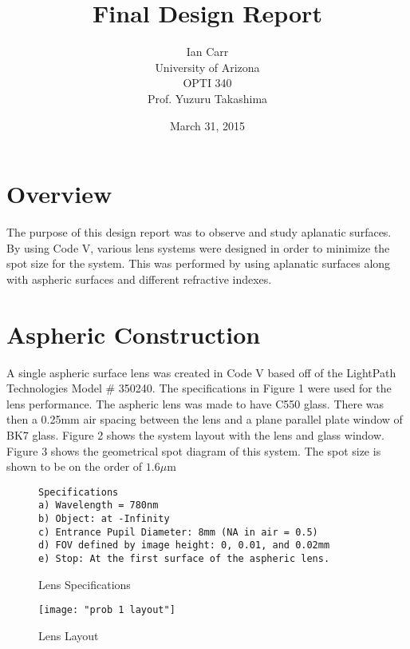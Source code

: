 \documentclass{article}
\begin{document}
\title{Final Design Report}
\author{Ian Carr\\
University of Arizona\\
OPTI 340\\
Prof. Yuzuru Takashima}
\date{March 31, 2015}

\maketitle

\newpage

\tableofcontents
\listoffigures


\section*{Overview}
The purpose of this design report was to observe and study aplanatic surfaces. By using Code V, various lens systems were designed in order to minimize the spot size for the system. This was performed by using aplanatic surfaces along with aspheric surfaces and different refractive indexes.

\newpage

\section{Aspheric Construction}

A single aspheric surface lens was created in Code V based off of the LightPath Technologies Model \# 350240. The specifications in Figure 1 were used for the lens performance. The aspheric lens was made to have C550 glass. There was then a 0.25mm air spacing between the lens and a plane parallel plate window of BK7 glass. Figure 2 shows the system layout with the lens and glass window. Figure 3 shows the geometrical spot diagram of this system. The spot size is shown to be on the order of $1.6\mu$m

\begin{figure}[H]
\begin{verbatim}
Specifications
a) Wavelength = 780nm
b) Object: at -Infinity
c) Entrance Pupil Diameter: 8mm (NA in air = 0.5)
d) FOV defined by image height: 0, 0.01, and 0.02mm
e) Stop: At the first surface of the aspheric lens.
\end{verbatim}
\centering
\caption{Lens Specifications}
\centering
\end{figure}

\begin{figure}[H]
\texttt{[image: "prob 1 layout"]}
\centering
\caption{Lens Layout}
\centering
\end{figure}
\end{document}
